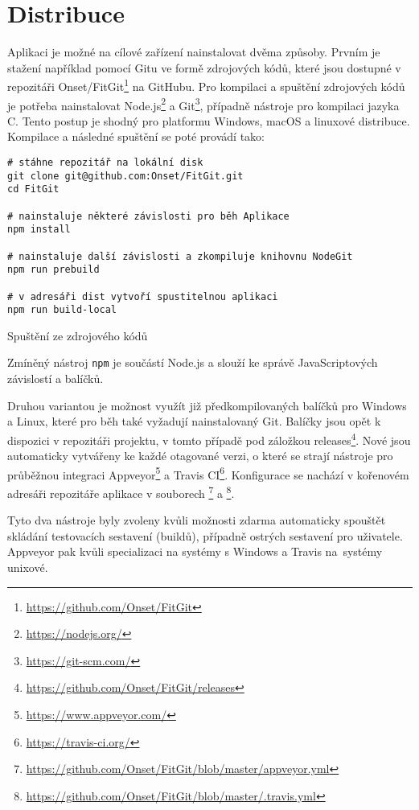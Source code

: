 \chapter{Distribuce}

Aplikaci je možné na cílové zařízení nainstalovat dvěma způsoby. Prvním je stažení například pomocí Gitu ve formě zdrojových kódů, které jsou dostupné v repozitáři Onset/FitGit\footnote{\url{https://github.com/Onset/FitGit}} na GitHubu. Pro kompilaci a spuštění zdrojových kódů je potřeba nainstalovat Node.js\footnote{\url{https://nodejs.org/}} a Git\footnote{\url{https://git-scm.com/}}, případně nástroje pro kompilaci jazyka C. Tento postup je shodný pro platformu Windows, macOS a linuxové distribuce. Kompilace a následné spuštění se poté provádí tako:

\FloatBarrier
\begin{listing}[ht]
	\begin{verbatim}
# stáhne repozitář na lokální disk
git clone git@github.com:Onset/FitGit.git
cd FitGit

# nainstaluje některé závislosti pro běh Aplikace
npm install

# nainstaluje další závislosti a zkompiluje knihovnu NodeGit
npm run prebuild

# v adresáři dist vytvoří spustitelnou aplikaci
npm run build-local
	\end{verbatim}
	\caption{Spuštění ze zdrojového kódů}
\end{listing}
\FloatBarrier

Zmíněný nástroj \texttt{npm} je součástí Node.js a slouží ke správě JavaScriptových závislostí a balíčků.

Druhou variantou je možnost využít již předkompilovaných balíčků pro Windows a Linux, které pro běh také vyžadují nainstalovaný Git. Balíčky jsou opět k dispozici v repozitáři projektu, v tomto případě pod záložkou releases\footnote{\url{https://github.com/Onset/FitGit/releases}}. Nové jsou automaticky vytvářeny ke každé otagované verzi, o které se strají nástroje pro průběžnou integraci Appveyor\footnote{\url{https://www.appveyor.com/}} a Travis CI\footnote{\url{https://travis-ci.org/}}. Konfigurace se nachází v kořenovém adresáři repozitáře aplikace v souborech \footnote{\url{https://github.com/Onset/FitGit/blob/master/appveyor.yml}} a \footnote{\url{https://github.com/Onset/FitGit/blob/master/.travis.yml}}.

Tyto dva nástroje byly zvoleny kvůli možnosti zdarma automaticky spouštět skládání testovacích sestavení (buildů), případně ostrých sestavení pro uživatele. Appveyor pak kvůli specializaci na systémy s Windows a Travis na~systémy unixové.

